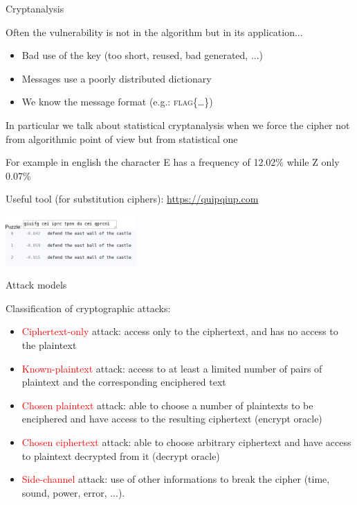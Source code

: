 \begin{frame}{Cryptanalysis}

Often the vulnerability is not in the algorithm but in its application...

\begin{itemize}
  \item Bad use of the key (too short, reused, bad generated, ...)
  \item Messages use a poorly distributed dictionary
  \item We know the message format (e.g.: \textsc{flag\{\ldots\}})
\end{itemize}

\medskip

In particular we talk about statistical cryptanalysis when we force the cipher not from algorithmic point of view but from statistical one

\medskip

For example in english the character E has a frequency of 12.02\% while Z only 0.07\%

\medskip

Useful tool (for substitution ciphers): \href{https://quipqiup.com}{https://quipqiup.com}

\medskip

\centering\includegraphics[width=5cm]{img/quipqiup.png}
  
\end{frame}

\begin{frame}{Attack models}

Classification of cryptographic attacks:

\medskip

\begin{itemize}
  \item \textcolor{red}{Ciphertext-only} attack: access only to the ciphertext, and has no access to the plaintext
  \medskip
  \item \textcolor{red}{Known-plaintext} attack: access to at least a limited number of pairs of plaintext and the corresponding enciphered text
  \medskip
  \item \textcolor{red}{Chosen plaintext} attack: able to choose a number of plaintexts to be enciphered and have access to the resulting ciphertext (encrypt oracle)
  \medskip
  \item \textcolor{red}{Chosen ciphertext} attack: able to choose arbitrary ciphertext and have access to plaintext decrypted from it (decrypt oracle) 
  \medskip
  \item \textcolor{red}{Side-channel} attack: use of other informations to break the cipher (time, sound, power, error, ...).
\end{itemize}
  
\end{frame}
